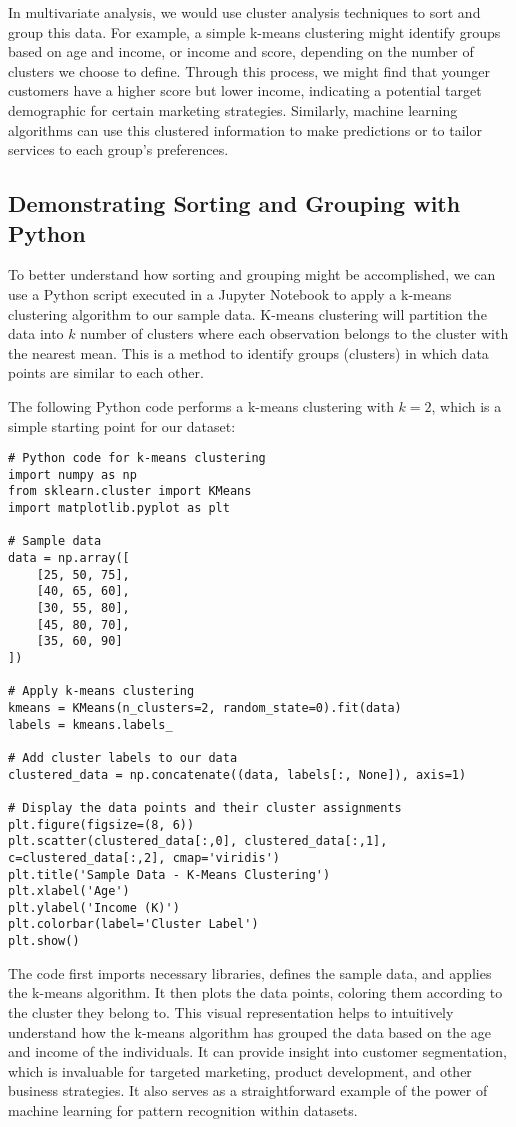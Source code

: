 \documentclass[a4paper,12pt]{book}
\newcounter{example}
\begin{document}
In multivariate analysis, we would use cluster analysis techniques to sort and group this data. For example, a simple k-means clustering might identify groups based on age and income, or income and score, depending on the number of clusters we choose to define. Through this process, we might find that younger customers have a higher score but lower income, indicating a potential target demographic for certain marketing strategies. Similarly, machine learning algorithms can use this clustered information to make predictions or to tailor services to each group's preferences.

\subsection{Demonstrating Sorting and Grouping with Python}
To better understand how sorting and grouping might be accomplished, we can use a Python script executed in a Jupyter Notebook to apply a k-means clustering algorithm to our sample data. K-means clustering will partition the data into $k$ number of clusters where each observation belongs to the cluster with the nearest mean. This is a method to identify groups (clusters) in which data points are similar to each other.

The following Python code performs a k-means clustering with $k=2$, which is a simple starting point for our dataset:

\begin{verbatim}
# Python code for k-means clustering
import numpy as np
from sklearn.cluster import KMeans
import matplotlib.pyplot as plt

# Sample data
data = np.array([
    [25, 50, 75],
    [40, 65, 60],
    [30, 55, 80],
    [45, 80, 70],
    [35, 60, 90]
])

# Apply k-means clustering
kmeans = KMeans(n_clusters=2, random_state=0).fit(data)
labels = kmeans.labels_

# Add cluster labels to our data
clustered_data = np.concatenate((data, labels[:, None]), axis=1)

# Display the data points and their cluster assignments
plt.figure(figsize=(8, 6))
plt.scatter(clustered_data[:,0], clustered_data[:,1], c=clustered_data[:,2], cmap='viridis')
plt.title('Sample Data - K-Means Clustering')
plt.xlabel('Age')
plt.ylabel('Income (K)')
plt.colorbar(label='Cluster Label')
plt.show()
\end{verbatim}

The code first imports necessary libraries, defines the sample data, and applies the k-means algorithm. It then plots the data points, coloring them according to the cluster they belong to. This visual representation helps to intuitively understand how the k-means algorithm has grouped the data based on the age and income of the individuals. It can provide insight into customer segmentation, which is invaluable for targeted marketing, product development, and other business strategies. It also serves as a straightforward example of the power of machine learning for pattern recognition within datasets.
\end{document}

